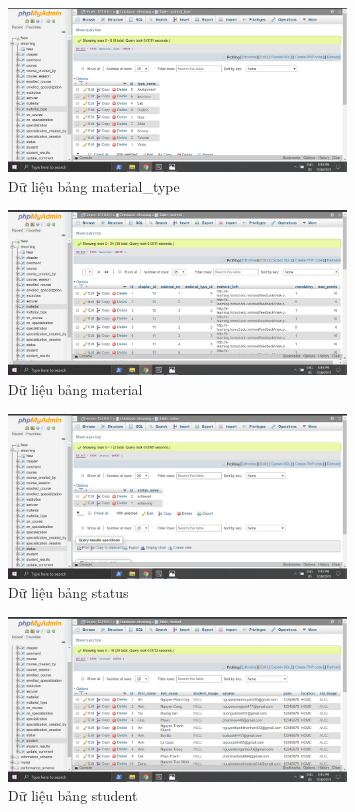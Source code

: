 \documentclass[12pt,a4paper,titlepage]{article}
\begin{document}
\begin{figure}[h!]
	\centering
	\caption{Dữ liệu bảng material_type}
	\includegraphics[width=0.8\textwidth]{images/dat11.png}
\end{figure}
\begin{figure}[h!]
	\centering
	\caption{Dữ liệu bảng material}
	\includegraphics[width=0.8\textwidth]{images/dat10.png}
\end{figure}
\newpage
\begin{figure}[h!]
	\centering
	\caption{Dữ liệu bảng status}
	\includegraphics[width=0.8\textwidth]{images/dat17.png}
\end{figure}
\begin{figure}[h!]
	\centering
	\caption{Dữ liệu bảng student}
	\includegraphics[width=0.8\textwidth]{images/dat18.png}
\end{figure}
\end{document}
